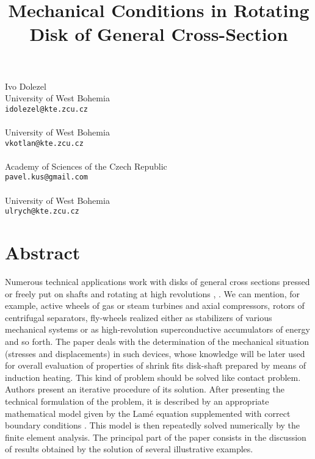 \title{Mechanical Conditions in Rotating Disk of General Cross-Section}
\author{}  \institute{}
\maketitle
\begin{center}
{\large Ivo Dolezel}\\
University of West Bohemia\\
{\tt idolezel@kte.zcu.cz}
\\ \vspace{4mm}{\large Vaclav Kotlan}\\
University of West Bohemia\\
{\tt vkotlan@kte.zcu.cz}
\\ \vspace{4mm}{\large Pavel Kus}\\
Academy of Sciences of the Czech Republic\\
{\tt pavel.kus@gmail.com}
\\ \vspace{4mm}{\large Bohus Ulrych}\\
University of West Bohemia\\
{\tt ulrych@kte.zcu.cz}

\end{center}

\section*{Abstract}

Numerous technical applications work with disks of general cross sections pressed or freely put on shafts and rotating at high revolutions \cite{skopek}, \cite{kim}. We can mention, for example, active wheels of gas or steam turbines and axial compressors, rotors of centrifugal separators, fly-wheels realized either as stabilizers of various mechanical systems or as high-revolution superconductive accumulators of energy and so forth. The paper deals with the determination of the mechanical situation (stresses and displacements) in such devices, whose knowledge will be later used for overall evaluation of properties of shrink fits disk-shaft prepared by means of induction heating. This kind of problem should be solved like contact problem. Authors present an iterative procedure of its solution. After presenting the technical formulation of the problem, it is described by an appropriate mathematical model given by the Lamé equation supplemented with correct boundary conditions \cite{pantelyat}. This model is then repeatedly solved numerically by the finite element analysis. The principal part of the paper consists in the discussion of results obtained by the solution of several illustrative examples.


